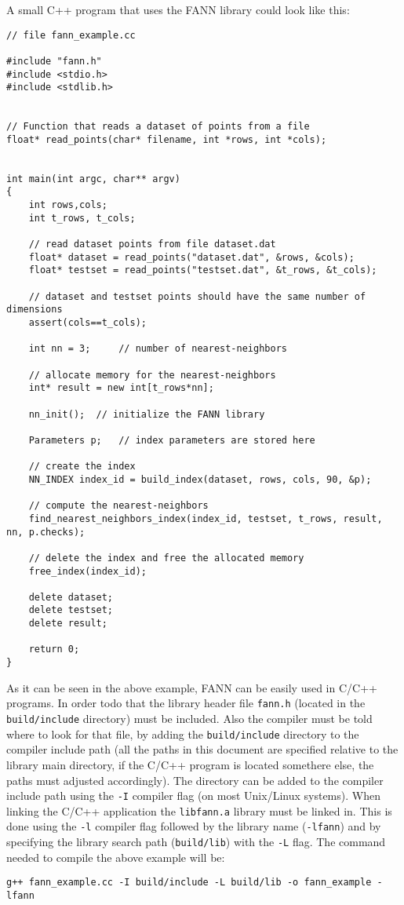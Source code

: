 \documentclass[letter,10pt]{article}
\begin{document}
A small C++ program that uses the FANN library could look like this:

\begin{Verbatim}[fontsize=\footnotesize,frame=single]
// file fann_example.cc

#include "fann.h"
#include <stdio.h>
#include <stdlib.h>


// Function that reads a dataset of points from a file
float* read_points(char* filename, int *rows, int *cols);


int main(int argc, char** argv)
{
    int rows,cols;
    int t_rows, t_cols;

    // read dataset points from file dataset.dat
    float* dataset = read_points("dataset.dat", &rows, &cols);
    float* testset = read_points("testset.dat", &t_rows, &t_cols);

    // dataset and testset points should have the same number of dimensions
    assert(cols==t_cols);

    int nn = 3;     // number of nearest-neighbors

    // allocate memory for the nearest-neighbors 
    int* result = new int[t_rows*nn];

    nn_init();  // initialize the FANN library

    Parameters p;   // index parameters are stored here

    // create the index
    NN_INDEX index_id = build_index(dataset, rows, cols, 90, &p);

    // compute the nearest-neighbors
    find_nearest_neighbors_index(index_id, testset, t_rows, result, nn, p.checks);

    // delete the index and free the allocated memory
    free_index(index_id);

    delete dataset;
    delete testset;
    delete result;

    return 0;
}

\end{Verbatim}

As it can be seen in the above example, FANN can be easily used in C/C++ programs. In order todo that the library header file \texttt{fann.h} (located in the \texttt{build/include} directory) must be included. Also the compiler must be told where to look for that file, by adding the \texttt{build/include} directory to the compiler include path (all the paths in this document are specified relative to the library main directory, if the C/C++ program is located somethere else, the paths must adjusted accordingly). The directory can be added to the compiler include path using the \texttt{-I} compiler flag (on most Unix/Linux systems). When linking the C/C++ application the \texttt{libfann.a} library must be linked in. This is done using the \texttt{-l} compiler flag followed by the library name (\texttt{-lfann}) and by specifying the library search path (\texttt{build/lib}) with the \texttt{-L} flag. The command needed to compile the above example will be:
\begin{Verbatim}[fontsize=\footnotesize]
g++ fann_example.cc -I build/include -L build/lib -o fann_example -lfann
\end{Verbatim}
\end{document}
